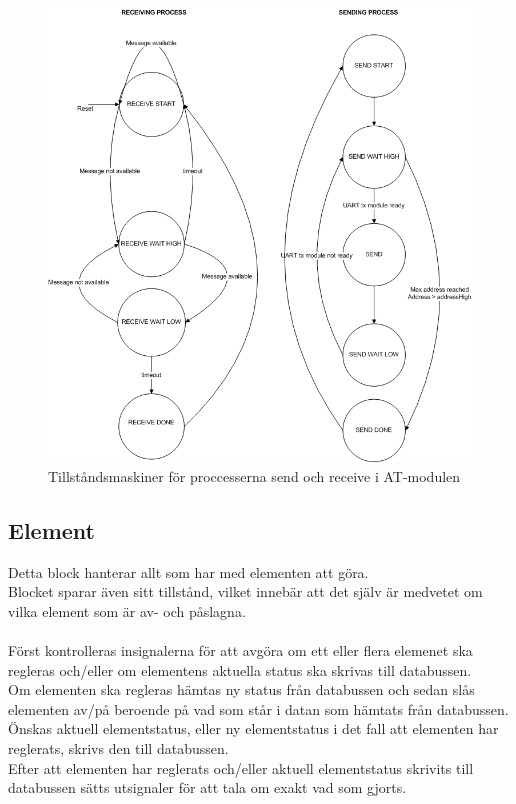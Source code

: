 \documentclass[a4paper]{scrartcl}
\begin{document}
		\begin{figure}[H]
			\centering
			\includegraphics[scale=0.5]{atprocessess.png}
			\caption{Tillståndsmaskiner för proccesserna send och receive i AT-modulen}
		\end{figure}


	

	\subsection{Element}
		Detta block hanterar allt som har med elementen att göra.
		\\
		Blocket sparar även sitt tillstånd, vilket innebär att det själv är medvetet om vilka element som är av- och påslagna.
		\\\\
		Först kontrolleras insignalerna för att avgöra om ett eller flera elemenet ska regleras och/eller om elementens aktuella status ska
		skrivas till databussen.
		\\
		Om elementen ska regleras hämtas ny status från databussen och sedan slås elementen av/på beroende på vad som står i datan som hämtats
		från databussen.
		\\
		Önskas aktuell elementstatus, eller ny elementstatus i det fall att elementen har reglerats, skrivs den till databussen.
		\\
		Efter att elementen har reglerats och/eller aktuell elementstatus skrivits till databussen sätts utsignaler för att tala om exakt
		vad som gjorts.
\end{document}
